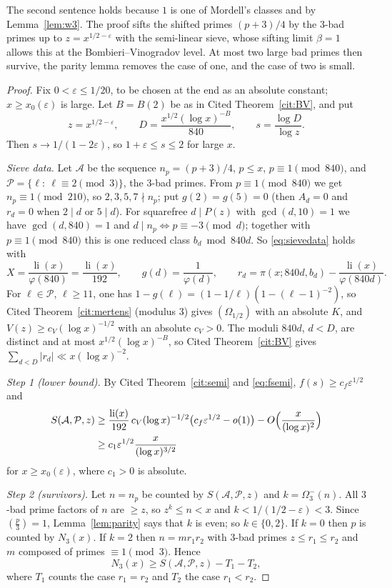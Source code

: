 \documentclass[11pt,reqno]{amsart}
\theoremstyle{definition}
\newcommand{\li}{\operatorname{li}}
\newcommand{\leg}[2]{\left(\frac{#1}{#2}\right)}
\begin{document}
The second sentence holds because $1$ is one of Mordell's classes and by
Lemma~\ref{lem:w3}.  The proof sifts the shifted primes $(p+3)/4$ by the
$3$-bad primes up to $z=x^{1/2-\varepsilon}$ with the semi-linear sieve,
whose sifting limit $\beta=1$ allows this at the Bombieri--Vinogradov
level.  At most two large bad primes then survive, the parity lemma
removes the case of one, and the case of two is small.

\begin{proof}
Fix $0<\varepsilon\le1/20$, to be chosen at the end as an absolute
constant; $x\ge x_0(\varepsilon)$ is large.  Let $B=B(2)$ be as in
Cited Theorem~\ref{cit:BV}, and put
\[
 z=x^{1/2-\varepsilon},\qquad D=\frac{x^{1/2}(\log x)^{-B}}{840},\qquad s=\frac{\log D}{\log z}.
\]
Then $s\to1/(1-2\varepsilon)$, so $1+\varepsilon\le s\le2$ for large $x$.

\emph{Sieve data.}  Let $\mathcal A$ be the sequence $n_p=(p+3)/4$, $p\le x$,
$p\equiv1\pmod{840}$, and $\mathcal P=\{\ell:\ \ell\equiv2\pmod3\}$, the
$3$-bad primes.  From $p\equiv1\pmod{840}$ we get $n_p\equiv1\pmod{210}$,
so $2,3,5,7\nmid n_p$; put $g(2)=g(5)=0$ (then $A_d=0$ and $r_d=0$ when
$2\mid d$ or $5\mid d$).  For squarefree $d\mid P(z)$ with $\gcd(d,10)=1$
we have $\gcd(d,840)=1$ and $d\mid n_p\iff p\equiv-3\pmod d$; together
with $p\equiv1\pmod{840}$ this is one reduced class $b_d\bmod 840d$.  So
\eqref{eq:sievedata} holds with
\[
 X=\frac{\li(x)}{\varphi(840)}=\frac{\li(x)}{192},\qquad g(d)=\frac1{\varphi(d)},\qquad
 r_d=\pi(x;840d,b_d)-\frac{\li(x)}{\varphi(840d)}.
\]
For $\ell\in\mathcal P$, $\ell\ge11$, one has
$1-g(\ell)=(1-1/\ell)(1-(\ell-1)^{-2})$, so Cited
Theorem~\ref{cit:mertens} (modulus $3$) gives $(\Omega_{1/2})$ with an
absolute $K$, and $V(z)\ge c_V(\log x)^{-1/2}$ with an absolute $c_V>0$.
The moduli $840d$, $d<D$, are distinct and at most
$x^{1/2}(\log x)^{-B}$, so Cited Theorem~\ref{cit:BV} gives
$\sum_{d<D}|r_d|\ll x(\log x)^{-2}$.

\emph{Step 1 (lower bound).}  By Cited Theorem~\ref{cit:semi} and
\eqref{eq:fsemi}, $f(s)\ge c_f\varepsilon^{1/2}$ and
\begin{align*}
 S(\mathcal A,\mathcal P,z)&\ge\frac{\li(x)}{192}\,c_V(\log x)^{-1/2}\bigl(c_f\varepsilon^{1/2}-o(1)\bigr)-O\Bigl(\frac x{(\log x)^2}\Bigr)\\
 &\ge c_1\varepsilon^{1/2}\frac{x}{(\log x)^{3/2}}
\end{align*}
for $x\ge x_0(\varepsilon)$, where $c_1>0$ is absolute.

\emph{Step 2 (survivors).}  Let $n=n_p$ be counted by $S(\mathcal A,\mathcal P,z)$
and $k=\Omega_3^-(n)$.  All $3$-bad prime factors of $n$ are $\ge z$, so
$z^k\le n<x$ and $k<1/(1/2-\varepsilon)<3$.  Since $\leg p3=1$,
Lemma~\ref{lem:parity} says that $k$ is even; so $k\in\{0,2\}$.  If $k=0$
then $p$ is counted by $N_3(x)$.  If $k=2$ then $n=mr_1r_2$ with $3$-bad
primes $z\le r_1\le r_2$ and $m$ composed of primes $\equiv1\pmod3$.  Hence
\[
 N_3(x)\ge S(\mathcal A,\mathcal P,z)-T_1-T_2,
\]
where $T_1$ counts the case $r_1=r_2$ and $T_2$ the case $r_1<r_2$.


\end{proof}
\end{document}
